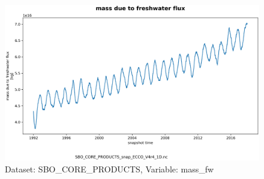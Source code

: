\begin{figure}[H]
\centering
\includegraphics[scale=0.55]{../images/plots/v4r4/oneD_plots/SBO_Core_Products/mass_fw.png}
\caption{Dataset: SBO\_CORE\_PRODUCTS, Variable: mass\_fw}
\label{tab:table-SBO_CORE_PRODUCTS_mass_fw-Plot}
\end{figure}
\newpage
\pagebreak

